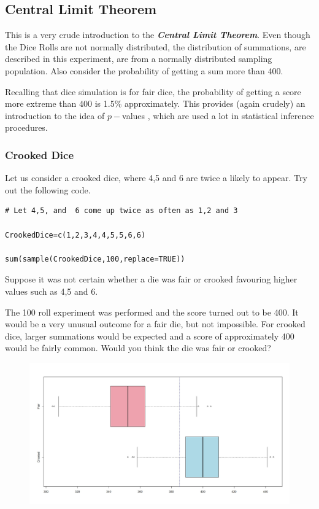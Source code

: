 \documentclass[11pt]{article} %
\begin{document}
\subsection{Central Limit Theorem}
This is a very crude introduction to the \textit{\textbf{Central Limit Theorem}}. Even though the Dice Rolls are not normally distributed, the distribution of summations, are described in this experiment, are from a normally distributed sampling population. Also consider the probability of getting a sum more than 400. 


Recalling that dice simulation is for fair dice, the probability of getting a score more extreme than 400 is 1.5\% approximately. This provides (again crudely) an introduction to the idea of $p-$values , which are used a lot in statistical inference procedures. 




\newpage
\subsubsection*{Crooked Dice}

Let us consider a crooked dice, where 4,5 and 6 are twice a likely to appear. Try out the following code.

\begin{framed}
\begin{verbatim}
# Let 4,5, and  6 come up twice as often as 1,2 and 3

CrookedDice=c(1,2,3,4,4,5,5,6,6)

sum(sample(CrookedDice,100,replace=TRUE))
\end{verbatim}
\end{framed}
Suppose it was not certain whether a die was fair or crooked favouring higher values such as 4,5 and 6. 


The 100 roll experiment was performed and the score turned out to be 400.  It would be a very unusual outcome for a fair die, but not impossible. For crooked dice, larger summations would be expected and a score of approximately 400 would be fairly common. Would you think the die was fair or crooked?


\begin{figure}
\centering
\includegraphics[width=0.7\linewidth]{./DiceBoxplot}
\caption{}
\label{fig:DiceBoxplot}
\end{figure}
\end{document}
